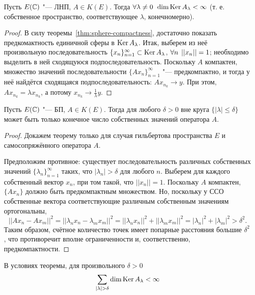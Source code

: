 \documentclass[main]{subfiles}
\begin{document}
\begin{theorem}
  Пусть \( E(\mathbb{C}) \) "--- ЛНП,
  \( A \in K(E) \).
  Тогда \( \forall {\lambda \ne 0} \; \, \dim \operatorname{Ker} A_\lambda < \infty \)
  (т. е. собственное пространство,
  соответствующее \( \lambda \),
  конечномерно).
\end{theorem}
\begin{proof}
  В силу теоремы~\ref{thm:sphere-compactness},
  достаточно показать предкомактность
  единичной сферы в \( \operatorname{Ker} A_\lambda \).
  Итак, выберем из неё
  произвольную последовательность
  \( \{ x_n \}_{n=1}^\infty \subset \operatorname{Ker} A_\lambda \),
  \( \forall {n} \; \, ||x_n|| = 1 \);
  необходимо выделить в ней
  сходящуюся подпоследовательность.
  Поскольку \( A \) компактен,
  множество значений последовательности
  \( \{ A x_n \}_{n=1}^\infty \) "--- предкомпактно,
  и тогда у неё найдётся сходящаяся подпоследовательность:
  \( A x_{n_k} \to y \).
  При этом, \( A x_{n_k} = \lambda x_{n_k} \),
  а потому
  \( x_{n_k} \to \frac{1}\lambda y \).
\end{proof}

\begin{theorem}\label{thm:compact-spectrum-bounds}%
  Пусть \( E(\mathbb{C}) \) "--- БП, \( A \in K(E) \).
  Тогда для любого \( \delta > 0 \) вне круга
  \( \{ |\lambda| \le \delta \} \) может быть
  только конечное число собственных значений оператора \( A \).
\end{theorem}
\begin{proof}
  Докажем теорему только для случая
  гильбертова пространства \( E \)
  и самосопряжённого оператора \( A \).

  Предположим противное: существует последовательность
  различных собственных значений \( \{ \lambda_n \}_{n=1}^\infty \)
  таких, что \( |\lambda_n| > \delta \) для любого \( n \).
  Выберем для каждого собственный вектор \( x_n \),
  при том такой, что \( ||x_n|| = 1 \).
  Поскольку \( A \) компактен,
  \( \{ A x_n \} \) должно быть предкомпактным множеством.
  Но, поскольку у ССО
  собственные вектора соответствующие
  различным собственным значениям
  ортогональны,
  \[
    ||A x_n - A x_m||^2 = ||\lambda_n x_n - \lambda_m x_m||^2 =
    ||\lambda_n x_n||^2 + ||\lambda_m x_m||^2 =
    |\lambda_n|^2 + |\lambda_m|^2 > \delta^2.
  \]
  Таким образом, счётное количество точек
  имеет попарные расстояния большие \( \delta^2 \),
  что противоречит вполне ограниченности и,
  соответственно, предкомпактности.
\end{proof}

\begin{corollary}
  В условиях теоремы, для произвольного \( \delta > 0 \)
  \[
    \sum_{|\lambda| > \delta} \dim \operatorname{Ker} A_\lambda < \infty
  \]
\end{corollary}
\end{document}
